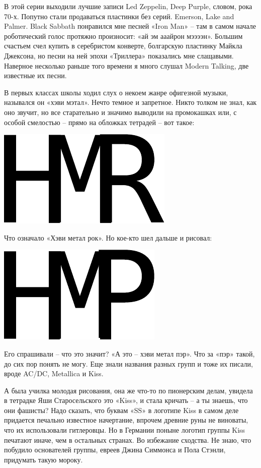 В этой серии выходили лучшие записи Led Zeppelin, Deep Purple, словом, рока 70-х. Попутно стали продаваться пластинки без серий. Emerson, Lake and Palmer. Black Sabbath понравился мне песней «Iron Man» – там в самом начале роботический голос протяжно произносит: «ай эм ааайрон мээээн». Большим счастьем счел купить в серебристом конверте, болгарскую пластинку Майкла Джексона, но песни на ней эпохи «Триллера» показались мне слащавыми. Наверное несколько раньше того времени я много слушал Modern Talking, две известные их песни.

В первых классах школы ходил слух о некоем жанре офигезной музыки, назывался он «хэви мэтал». Нечто темное и запретное. Никто толком не знал, как оно звучит, но все старательно и значимо выводили на промокашках или, с особой смелостью – прямо на обложках тетрадей – вот такое:

\begin{center}
\includegraphics[width=0.20\linewidth]{chast-vosp/musmags/hmr.pdf}
\end{center}

Что означало «Хэви метал рок». Но кое-кто шел дальше и рисовал:

\begin{center}
\includegraphics[width=0.20\linewidth]{chast-vosp/musmags/hmp.pdf}
\end{center}

Его спрашивали – что это значит? «А это – хэви метал пэр». Что за «пэр» такой, до сих пор понять не могу. Еще знали названия разных групп и тоже их писали, вроде AC/DC, Metallica и Kiss.

А была училка молодая рисования, она же что-то по пионерским делам, увидела в тетрадке Яши Старосельского это «Kiss», и стала кричать – а ты знаешь, что они фашисты? Надо сказать, что буквам «SS» в логотипе Kiss в самом деле придается печально известное начертание, впрочем древние руны не виноваты, что их использовали гитлеровцы. Но в Германии поныне логотип группы Kiss печатают иначе, чем в остальных странах. Во избежание сходства. Не знаю, что побудило основателей группы, евреев Джина Симмонса и Пола Стэнли, придумать такую мороку.

